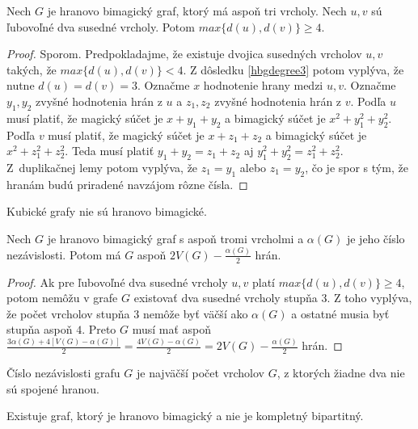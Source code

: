 \begin{theorem} Nech $G$ je hranovo bimagický graf, ktorý má aspoň tri vrcholy. Nech $u,v$ sú ľubovoľné dva susedné vrcholy. Potom $max \{d(u), d(v)\} \geq 4$.
\end{theorem}

\begin{proof} Sporom. Predpokladajme, že existuje dvojica susedných vrcholov $u,v$ takých, že $max \{d(u), d(v)\} < 4$. Z dôsledku \ref{hbgdegree3} potom vyplýva, že nutne $d(u) = d(v) = 3$. Označme $x$ hodnotenie hrany medzi $u,v$. Označme $y_1, y_2$ zvyšné hodnotenia hrán z $u$ a $z_1, z_2$ zvyšné hodnotenia hrán z $v$. Podľa $u$ musí platiť, že magický súčet je $x + y_1 + y_2$ a bimagický súčet je $x^2 + y^2_1 + y^2_2$. Podľa $v$ musí platiť, že magický súčet je $x + z_1 + z_2$ a bimagický súčet je $x^2 + z^2_1 + z^2_2$. Teda musí platiť $y_1 + y_2 = z_1 + z_2$ aj $y^2_1 + y^2_2 = z^2_1 + z^2_2$. Z~duplikačnej lemy potom vyplýva, že $z_1 = y_1$ alebo $z_1 = y_2$, čo je spor s tým, že hranám budú priradené navzájom rôzne čísla.
\end{proof} 

\begin{consequence} Kubické grafy nie sú hranovo bimagické.
\end{consequence}

\begin{consequence} Nech $G$ je hranovo bimagický graf s aspoň tromi vrcholmi a $\alpha (G)$ je jeho číslo nezávislosti. Potom má $G$ aspoň $2V(G) - \frac{\alpha (G)}{2}$ hrán.
\end{consequence}

\begin{proof} Ak pre ľubovoľné dva susedné vrcholy $u,v$ platí $max \{d(u), d(v)\} \geq 4$, potom nemôžu v grafe $G$ existovať dva susedné vrcholy stupňa $3$. Z toho vyplýva, že počet vrcholov stupňa $3$ nemôže byť väčší ako $\alpha (G)$ a ostatné musia byť stupňa aspoň $4$. Preto $G$ musí mať aspoň $\frac{3 \alpha (G) + 4[V(G) - \alpha (G)]}{2} = \frac{4 V(G) - \alpha(G)}{2} = 2 V(G) - \frac{\alpha (G)}{2}$ hrán.
\end{proof}

\begin{note} Číslo nezávislosti grafu $G$ je najväčší počet vrcholov $G$, z ktorých žiadne dva nie sú spojené hranou.
\end{note}

\begin{theorem} Existuje graf, ktorý je hranovo bimagický a nie je kompletný bipartitný.
\end{theorem}

